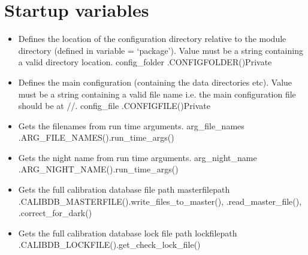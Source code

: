 \ifdevguide
\clearpage
\newpage
\section{Startup variables}
\label{ch:variables:startup}

\begin{itemize}


\item \label{text:config_folder} 
{Defines the location of the configuration directory relative to the module directory (defined in variable = `package'). Value must be a string containing a valid directory location.}
{config\_folder}{\configdirrelpath}
{\AllRecipes}{\spirouConst.CONFIGFOLDER()}{\AllRecipes}{Private}


\item \label{text:config_file} 
{Defines the main configuration (containing the data directories etc).  Value must be a string containing a valid file name i.e. the main configuration file should be at //.}
{config\_file}{\configtxtfile}
{\AllRecipes}{\spirouConst.CONFIGFILE()}{\AllRecipes}{Private}


\item {}
{Gets the filenames from run time arguments.}
{arg\_file\_names}
{\AllRecipes}{\spirouConst.ARG\_FILE\_NAMES()}{\spirouStartup.run\_time\_args()}


\item {}
{Gets the night name from run time arguments.}
{arg\_night\_name}
{\AllRecipes}{\spirouConst.ARG\_NIGHT\_NAME()}{\spirouStartup.run\_time\_args()}


\item {}
{Gets the full calibration database file path}
{masterfilepath}
{\AllRecipes}{\spirouConst.CALIBDB\_MASTERFILE()}{\spirouCDB.write\_files\_to\_master(), \spirouCDB.read\_master\_file(), \spirouImage.correct\_for\_dark()}


\item {}
{Gets the full calibration database lock file path}
{lockfilepath}
{\AllRecipes}{\spirouConst.CALIBDB\_LOCKFILE()}{\spirouCDB.get\_check\_lock\_file()}



\end{itemize}
